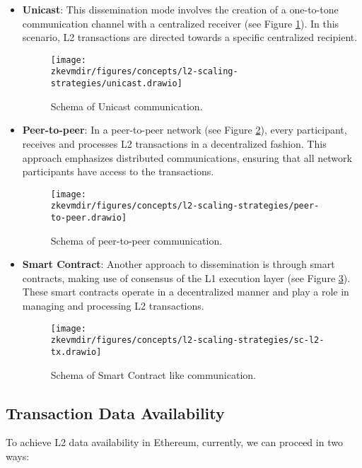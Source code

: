 \begin{itemize}

\item \textbf{Unicast}: This dissemination mode involves the creation of a one-to-tone communication channel with a centralized receiver (see Figure \ref{fig:unicast-diss}). In this scenario, L2 transactions are directed towards a specific centralized recipient.

\begin{figure}[H]
\centering
\texttt{[image: \\zkevmdir/figures/concepts/l2-scaling-strategies/unicast.drawio]}
\caption{Schema of Unicast communication.}
\label{fig:unicast-diss}
\end{figure}

\item \textbf{Peer-to-peer}: In a peer-to-peer network (see Figure \ref{fig:p2p-diss}), every participant, receives and processes L2 transactions in a decentralized fashion. This approach emphasizes distributed communications, ensuring that all network participants have access to the transactions.

\begin{figure}[H]
\centering
\texttt{[image: \\zkevmdir/figures/concepts/l2-scaling-strategies/peer-to-peer.drawio]}
\caption{Schema of peer-to-peer communication.}
\label{fig:p2p-diss}
\end{figure}

\item \textbf{Smart Contract}: Another approach to dissemination is through smart contracts, making use of consensus of the L1 execution layer (see Figure \ref{fig:sc-diss}). These smart contracts operate in a decentralized manner and play a role in managing and processing L2 transactions.

\begin{figure}[H]
\centering
\texttt{[image: \\zkevmdir/figures/concepts/l2-scaling-strategies/sc-l2-tx.drawio]}
\caption{Schema of Smart Contract like communication.}
\label{fig:sc-diss}
\end{figure}

\end{itemize}

\subsection{Transaction Data Availability}

To achieve L2 data availability in Ethereum, currently, we can proceed in two
ways:

